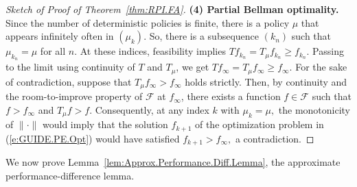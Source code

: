 \documentclass[twoside]{article}
\theoremstyle{plain}
\theoremstyle{definition}
\theoremstyle{remark}
\newcommand{\cF}{\mathcal{F}}
\renewcommand{\eqref}[1]{(\ref{#1})}
\begin{document}
\begin{proof}[Sketch of Proof of Theorem~\ref{thm:RPI.FA}]
\textbf{(4) Partial Bellman optimality.}
Since the number of deterministic policies is finite, there is a policy $\mu$ that appears infinitely often in $(\mu_k)$. 
So, there is a subsequence $(k_n)$ such that $\mu_{k_n} = \mu$ for all $n$. At these indices, feasibility implies $T f_{k_n} = T_\mu f_{k_n} \ge f_{k_n}$. 
Passing to the limit using continuity of $T$ and $T_\mu$, we get $T f_\infty = T_\mu f_\infty \ge f_\infty.$ For the sake of contradiction, suppose that $T_\mu f_\infty > f_\infty$ holds strictly. Then, by continuity and the room-to-improve property of $\cF$ at $f_\infty$, there exists a function $f \in \cF$ such that $f > f_\infty$ and $T_\mu f > f$. 
Consequently, at any index $k$ with $\mu_k = \mu,$ the monotonicity of $\|\cdot\|$ would imply that the solution $f_{k + 1}$ of the optimization problem in \eqref{e:GUIDE.PE.Opt} would have satisfied $f_{k + 1} > f_\infty,$ a contradiction.
%
\end{proof}


We now prove Lemma~\ref{lem:Approx.Performance.Diff.Lemma}, the approximate performance-difference lemma. 
\end{document}
